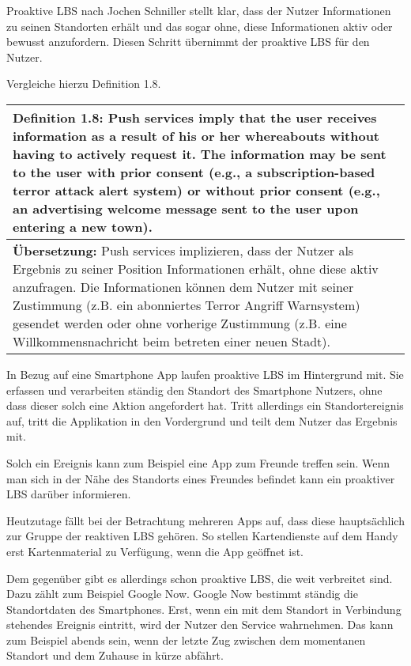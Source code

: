 Proaktive LBS nach Jochen Schniller stellt klar, dass der Nutzer Informationen zu seinen Standorten erhält und das sogar ohne, diese Informationen aktiv oder bewusst anzufordern. Diesen Schritt übernimmt der proaktive LBS für den Nutzer.

Vergleiche hierzu Definition 1.8.

\begin{table}[h]
	\centering
	\begin{tabular}{|p{16cm}|}\hline
		\textbf{Definition 1.8:} \glqq Push services imply that the user receives information as a result of his or her whereabouts without having to actively request it. The information may be sent to the user with prior consent (e.g., a subscription-based terror attack alert system) or without prior consent (e.g., an advertising welcome message sent to the user upon entering a new town). \grqq \cite[S.20]{Schiller2004} \\ \hline
		\textbf{Übersetzung:} Push services implizieren, dass der Nutzer als Ergebnis zu seiner Position Informationen erhält, ohne diese aktiv anzufragen. Die Informationen können dem Nutzer mit seiner  Zustimmung (z.B. ein abonniertes Terror Angriff Warnsystem) gesendet werden oder ohne vorherige Zustimmung (z.B. eine Willkommensnachricht beim betreten einer neuen Stadt).\\ \hline
	\end{tabular}
\end{table}

In Bezug auf eine Smartphone App laufen proaktive LBS im Hintergrund mit. Sie erfassen und verarbeiten ständig den Standort des Smartphone Nutzers, ohne dass dieser solch eine Aktion angefordert hat. Tritt allerdings ein Standortereignis auf, tritt die Applikation in den Vordergrund und teilt dem Nutzer das Ergebnis mit. 

Solch ein Ereignis kann zum Beispiel eine App zum Freunde treffen sein. Wenn man sich in der Nähe des Standorts eines Freundes befindet kann ein proaktiver LBS darüber informieren. 


Heutzutage fällt bei der Betrachtung mehreren Apps auf, dass diese hauptsächlich zur Gruppe der reaktiven LBS gehören. So stellen Kartendienste auf dem Handy erst Kartenmaterial zu Verfügung, wenn die App geöffnet ist. 

Dem gegenüber gibt es allerdings schon proaktive LBS, die weit verbreitet sind. Dazu zählt zum Beispiel Google Now. Google Now bestimmt ständig die Standortdaten des Smartphones. Erst, wenn ein mit dem Standort in Verbindung stehendes Ereignis eintritt, wird der Nutzer den Service wahrnehmen. Das kann zum Beispiel abends sein, wenn der letzte Zug zwischen dem momentanen Standort und dem Zuhause in kürze abfährt.
